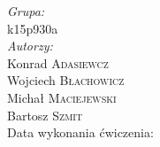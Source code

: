 \begin{titlepage}
\flushright
\Large \emph{Grupa:}\\
k15p930a\\[0.5cm]
\Large \emph{Autorzy:}\\
Konrad \textsc{Adasiewcz}\\[0.1cm] %
Wojciech \textsc{Błachowicz}\\[0.1cm] %
Michał \textsc{Maciejewski}\\[0.1cm] %
Bartosz \textsc{Szmit}\\[3cm] %

Data wykonania ćwiczenia: \\
{\large {}}\\[1cm]


\vfill %

\end{titlepage}